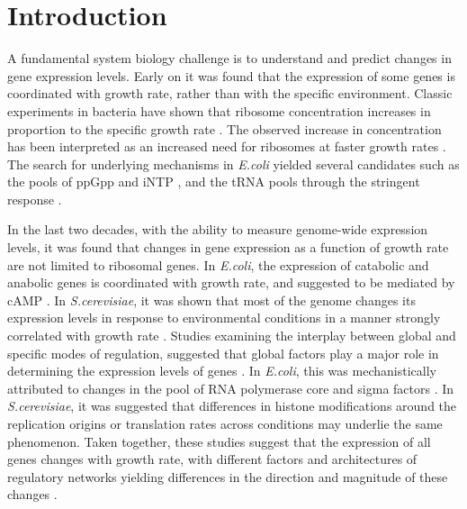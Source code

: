 \documentclass{article}
\begin{document}
\section{Introduction}
A fundamental system biology challenge is to understand and predict changes in gene expression levels.
Early on it was found that the expression of some genes is coordinated with growth rate, rather than with the specific environment.
Classic experiments in bacteria have shown that ribosome concentration increases in proportion to the specific growth rate \cite{Schaechter1958}.
The observed increase in concentration has been interpreted as an increased need for ribosomes at faster growth rates \cite{Neidhardt1999,Dennis2004,Zaslaver2009,Molenaar2009}.
The search for underlying mechanisms in \emph{E.coli} yielded several candidates \cite{Nomura1984} such as the pools of ppGpp and iNTP \cite{Murray_2003,Bosdriesz_2015}, and the tRNA pools through the stringent response \cite{Chatterji2001,Brauer2008a}.

In the last two decades, with the ability to measure genome-wide expression levels, it was found that changes in gene expression as a function of growth rate are not limited to ribosomal genes.
In \emph{E.coli}, the expression of catabolic and anabolic genes is coordinated with growth rate, and suggested to be mediated by cAMP \cite{Saldanha2004,You_2013,Peebo_2015}.
In \emph{S.cerevisiae}, it was shown that most of the genome changes its expression levels in response to environmental conditions in a manner strongly correlated with growth rate \cite{Keren2013,Brauer2008,Castrillo2007,Gerosa2013}.
Studies examining the interplay between global and specific modes of regulation, suggested that global factors play a major role in determining the expression levels of genes \cite{Gasch2000,Klumpp2009,Klumpp2014,Scott2010,Berthoumieux2013,Keren2013,Gerosa2013,Valgepea2013,Hui_2015}.
In \emph{E.coli}, this was mechanistically attributed to changes in the pool of RNA polymerase core and sigma factors \cite{Klumpp2008}.
In \emph{S.cerevisiae}, it was suggested that differences in histone modifications around the replication origins \cite{Regenberg2006} or translation rates \cite{Brauer2008} across conditions may underlie the same phenomenon.
Taken together, these studies suggest that the expression of all genes changes with growth rate, with different factors and architectures of regulatory networks yielding differences in the direction and magnitude of these changes \cite{Klumpp2009,Klumpp2014}. 
\end{document}

